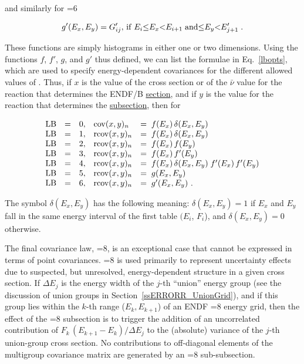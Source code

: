 \noindent
and similarly for =6

\begin{equation}
g'(E_x,E_y) = G'_{ij}, \, {\rm {if}}\;  E_i  {\leq} E_x {<} E_{i+1}\;{\rm {and}}
{\leq} E_y{<}E'_{j+1} \;.
\end{equation}
\vspace{1 pt}

\noindent
These functions are simply histograms in either one or two dimensions.
Using the functions $f$, $f'$, $g$, and $g'$ thus defined, we can list
the formulae in Eq.~\ref{lbopts}, which are used to specify energy-dependent
covariances for the different allowed values of .  Thus, if
$x$ is the value of the cross section or of the $\bar{\nu}$ value for the
reaction  that determines the ENDF/B
\underline{section}, and if $y$ is the value for the reaction
 that determines the \underline{subsection}, then for

\begin{equation}
\begin{array} {rrrll}
{\rm {LB}} & = & 0, &  {\rm {{\rm cov}}} (x,y)_n   & = \; f (E_x) \,
  \delta (E_x,E_y)   \\
{\rm {LB}} & = & 1, &  {\rm {r{\rm cov}}} (x,y)_n  & =  \; f (E_x) \,
  \delta (E_x,E_y)  \\
{\rm {LB}} & = & 2, &  {\rm {r{\rm cov}}} (x,y)_n  & =  \; f (E_x)\,f(E_y)  \\
{\rm {LB}} & = & 3, &  {\rm {r{\rm cov}}} (x,y)_n  & =  \;f (E_x)\,f'(E_y) \\
{\rm {LB}} & = & 4, &  {\rm {r{\rm cov}}} (x,y)_n  & = \; f (E_x) \,
  \delta (E_x,E_y)\;f'(E_x)\,f'(E_y)
\\ {\rm {LB}} & = & 5, &  {\rm {r{\rm cov}}} (x,y)_n  & =  \;g (E_x,E_y)  \\
{\rm {LB}} & = & 6, &  {\rm {r{\rm cov}}} (x,y)_n  & = \; g'(E_x,E_y)\,\,.
\end{array}
\label{lbopts}
\end{equation}

\noindent
The symbol $\delta (E_x,E_y)$ has the following meaning: $\delta
(E_x,E_y){ =} 1$ if $E_x$ and $E_y$ fall in the same energy interval of
the first table $(E_i$, $F_i$), and $\delta(E_x,E_y){ =} 0$ otherwise.

The final covariance law, =8, is an exceptional case that
cannot be expressed in terms of point covariances.  =8 is
used primarily to represent uncertainty effects due to suspected, but
unresolved, energy-dependent structure in a given cross section.  If
$\Delta E_j$ is the energy width of the $j$-th ``union'' energy group
(see the discussion of union groups in Section~\ref{ssERRORR_UnionGrid}),
and if this group
lies within the $k$-th range ($E_k, E_{k+1}$) of an ENDF =8
energy grid, then the effect of the =8 subsection is to
trigger the addition of an uncorrelated contribution of
$F_k\,(E_{k+1} - E_k )/\Delta E_j$ to the (absolute) variance
of the $j$-th union-group cross section.  No contributions to
off-diagonal elements of the multigroup covariance matrix are
generated by an =8 sub-subsection.

